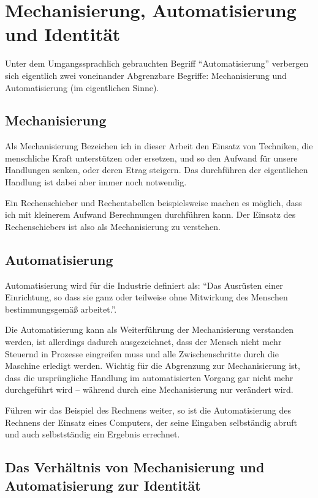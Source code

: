 \section {Mechanisierung, Automatisierung und Identität}

Unter dem Umgangssprachlich gebrauchten Begriff \enquote{Automatisierung} verbergen sich eigentlich zwei voneinander Abgrenzbare Begriffe: Mechanisierung und Automatisierung (im eigentlichen Sinne).

\subsection {Mechanisierung}

Als Mechanisierung Bezeichen ich in dieser Arbeit den Einsatz von Techniken, die menschliche Kraft unterstützen oder ersetzen, und so den Aufwand für unsere Handlungen senken, oder deren Etrag steigern.
Das durchführen der eigentlichen Handlung ist dabei aber immer noch notwendig.

Ein Rechenschieber und Rechentabellen beispielsweise machen es möglich, dass ich mit kleinerem Aufwand Berechnungen durchführen kann.
Der Einsatz des Rechenschiebers ist also als Mechanisierung zu verstehen.

\subsection {Automatisierung}

Automatisierung wird für die Industrie definiert als: \enquote{Das Ausrüsten einer Einrichtung, so dass sie ganz oder teilweise ohne Mitwirkung des Menschen bestimmungsgemäß arbeitet.}\parencite{din19233}.

Die Automatisierung kann als Weiterführung der Mechanisierung verstanden werden\parencite{ulrich}, ist allerdings dadurch ausgezeichnet, dass der Mensch nicht mehr Steuernd in Prozesse eingreifen muss und alle Zwischenschritte durch die Maschine erledigt werden.
Wichtig für die Abgrenzung zur Mechanisierung ist, dass die ursprüngliche Handlung im automatisierten Vorgang gar nicht mehr durchgeführt wird – während durch eine Mechanisierung nur verändert wird.


Führen wir das Beispiel des Rechnens weiter, so ist die Automatisierung des Rechnens der Einsatz eines Computers, der seine Eingaben selbständig abruft und auch selbstständig ein Ergebnis errechnet.

\subsection {Das Verhältnis von Mechanisierung und Automatisierung zur Identität}

